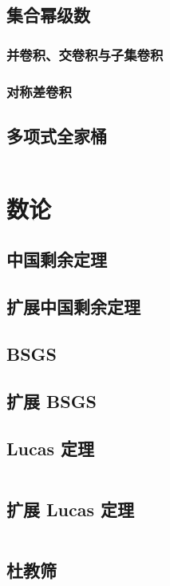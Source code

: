 \documentclass[12pt, a4paper, oneside]{ctexart}
\begin{document}
\begin{multicols}{2}
        \subsection{集合幂级数}
        \subsubsection{并卷积、交卷积与子集卷积}
        
        \subsubsection{对称差卷积}
        
        \subsection{多项式全家桶}
        \inputminted{cpp}{src/poly/poly.cpp}

        \section{数论}
        \subsection{中国剩余定理}
        
        \subsection{扩展中国剩余定理}
        
        \subsection{BSGS}
        
        \subsection{扩展 BSGS}
        
        \subsection{Lucas 定理}
        \inputminted{cpp}{src/number theory/lucas.cpp}
        \subsection{扩展 Lucas 定理}
        \inputminted{cpp}{src/number theory/exlucas.cpp}
        \subsection{杜教筛}
        

\end{multicols}
\end{document}
